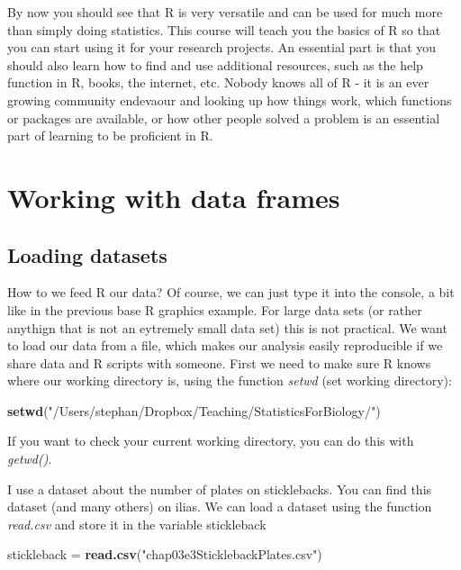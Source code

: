 \documentclass[]{article}
\newenvironment{Shaded}{\begin{snugshade}}{\end{snugshade}}
\newcommand{\KeywordTok}[1]{\textcolor[rgb]{0.13,0.29,0.53}{\textbf{#1}}}
\newcommand{\NormalTok}[1]{#1}
\newcommand{\StringTok}[1]{\textcolor[rgb]{0.31,0.60,0.02}{#1}}
\begin{document}
By now you should see that R is very versatile and can be used for much
more than simply doing statistics. This course will teach you the basics
of R so that you can start using it for your research projects. An
essential part is that you should also learn how to find and use
additional resources, such as the help function in R, books, the
internet, etc. Nobody knows all of R - it is an ever growing community
endevaour and looking up how things work, which functions or packages
are available, or how other people solved a problem is an essential part
of learning to be proficient in R.

\hypertarget{working-with-data-frames}{%
\section{Working with data frames}\label{working-with-data-frames}}

\hypertarget{loading-datasets}{%
\subsection{Loading datasets}\label{loading-datasets}}

How to we feed R our data? Of course, we can just type it into the
console, a bit like in the previous base R graphics example. For large
data sets (or rather anythign that is not an eytremely small data set)
this is not practical. We want to load our data from a file, which makes
our analysis easily reproducible if we share data and R scripts with
someone. First we need to make sure R knows where our working directory
is, using the function \emph{setwd} (set working directory):

\begin{Shaded}
\begin{Highlighting}[]
\KeywordTok{setwd}\NormalTok{(}\StringTok{"/Users/stephan/Dropbox/Teaching/StatisticsForBiology/"}\NormalTok{)}
\end{Highlighting}
\end{Shaded}

If you want to check your current working directory, you can do this
with \emph{getwd()}.

I use a dataset about the number of plates on sticklebacks. You can find
this dataset (and many others) on ilias. We can load a dataset using the
function \emph{read.csv} and store it in the variable stickleback

\begin{Shaded}
\begin{Highlighting}[]
\NormalTok{stickleback =}\StringTok{ }\KeywordTok{read.csv}\NormalTok{(}\StringTok{"chap03e3SticklebackPlates.csv"}\NormalTok{)}
\end{Highlighting}
\end{Shaded}
\end{document}
